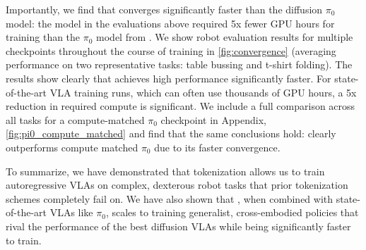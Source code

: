 Importantly, we find that \GeneralistModelAcronym{} converges significantly faster than the diffusion $\pi_0$ model: the model in the evaluations above required 5x fewer GPU hours for training than the $\pi_0$ model from \citet{black2024pi_0}. We show robot evaluation results for multiple checkpoints throughout the course of training in \cref{fig:convergence} (averaging performance on two representative tasks: table bussing and t-shirt folding). The results show clearly that \GeneralistModelAcronym{} achieves high performance significantly faster. For state-of-the-art VLA training runs, which can often use thousands of GPU hours, a 5x reduction in required compute is significant. We include a full comparison across all tasks for a compute-matched $\pi_0$ checkpoint in Appendix, \cref{fig:pi0_compute_matched} and find that the same conclusions hold: \GeneralistModelAcronym{} clearly outperforms compute matched $\pi_0$ due to its faster convergence.

To summarize, we have demonstrated that \ModelAcronym{} tokenization allows us to train autoregressive VLAs on complex, dexterous robot tasks that prior tokenization schemes completely fail on. We have also shown that \ModelAcronym{}, when combined with state-of-the-art VLAs like $\pi_0$, scales to training generalist, cross-embodied policies that rival the performance of the best diffusion VLAs while being significantly faster to train. 



